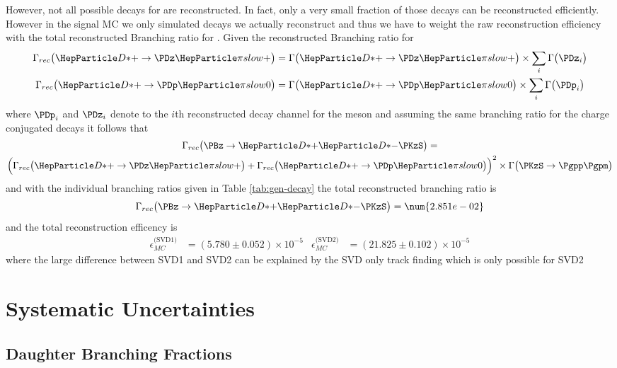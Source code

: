 \documentclass[a4paper]{report}
\def\ReconstructedBR{\num{2.851e-02}}
\def\ReconstructionEffSVDOne{(5.780 \pm 0.052) \times 10^{-5}}
\def\ReconstructionEffSVDTwo{(21.825 \pm 0.102) \times 10^{-5}}
\begin{document}
However, not all possible decays for \ddk are reconstructed. In fact, only a
very small fraction of those decays can be reconstructed efficiently. However in
the signal MC we only simulated decays we actually reconstruct and thus we
have to weight the raw reconstruction efficiency with the total reconstructed
Branching ratio for \ddk. Given the reconstructed Branching ratio for \PDst
\begin{align}
    \BR_{rec}\big(\PDstp \rightarrow \PDz\Pgpps\big) &=
    \BR\big(\PDstp \rightarrow \PDz\Pgpps\big) \times \sum_i \BR\big(\PDz_i\big)\\
    \BR_{rec}\big(\PDstp \rightarrow \PDp\Pgpzs\big) &=
    \BR\big(\PDstp \rightarrow \PDp\Pgpzs\big) \times \sum_i \BR\big(\PDp_i\big)
\end{align}
where $\PDp_i$ and $\PDz_i$ denote to the $i$th reconstructed decay channel for
the \PD meson and assuming the same branching ratio for the charge conjugated
decays it follows that
\begin{multline}
    \BR_{rec}\big(\ddk\big) = \\
    \Big(
    \BR_{rec}\big(\PDstp \rightarrow \PDz\Pgpps\big)
    + \BR_{rec}\big(\PDstp
    \rightarrow \PDp\Pgpzs\big)
    \Big)^2
    \times \BR\big(\PKzS \rightarrow \Pgpp\Pgpm \big)
    \label{eq:total-rec-br}
\end{multline}
and with the individual branching ratios given in Table \ref{tab:gen-decay} the
total reconstructed branching ratio is
\begin{equation}
    \BR_{rec}\big(\ddk\big) = \ReconstructedBR
\end{equation}
and the total reconstruction efficency is
\begin{align}
    \epsilon_{MC}^{\text{(SVD1)}} & = \ReconstructionEffSVDOne &
    \epsilon_{MC}^{\text{(SVD2)}} & = \ReconstructionEffSVDTwo
\end{align}
where the large difference between SVD1 and SVD2 can be explained by the SVD
only track finding which is only possible for SVD2

\section{Systematic Uncertainties}

\subsection{Daughter Branching Fractions}
\end{document}
